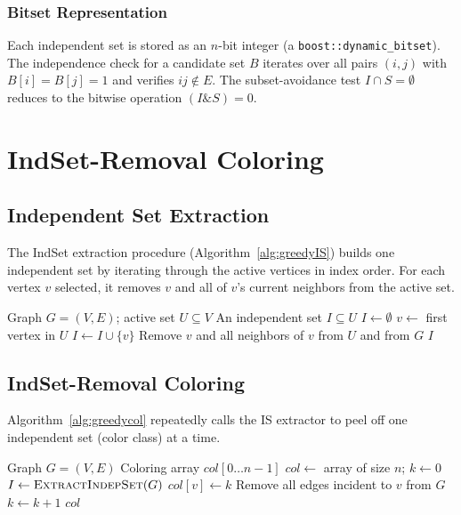 \documentclass[11pt]{article}
\begin{document}
\subsubsection*{Bitset Representation}

Each independent set is stored as an $n$-bit integer (a
\texttt{boost::dynamic\_bitset}).  The independence check for a candidate set
$B$ iterates over all pairs $(i,j)$ with $B[i]=B[j]=1$ and verifies $ij \notin
E$.  The subset-avoidance test $I \cap S = \emptyset$ reduces to the bitwise
operation $(I \mathbin{\&} S) = 0$.

\section{IndSet-Removal Coloring}\label{sec:heuristic}

\subsection{Independent Set Extraction}

The IndSet extraction procedure (Algorithm~\ref{alg:greedyIS}) builds one
independent set by iterating through the active vertices in index order.
For each vertex $v$ selected, it removes $v$ and all of $v$'s current
neighbors from the active set.

\begin{algorithm}
\caption{Independent set extraction}\label{alg:greedyIS}
\begin{algorithmic}[1]
\Require Graph $G = (V, E)$; active set $U \subseteq V$
\Ensure An independent set $I \subseteq U$
\State $I \gets \emptyset$
  \State $v \gets$ first vertex in $U$
  \State $I \gets I \cup \{v\}$
  \State Remove $v$ and all neighbors of $v$ from $U$ and from $G$
\EndWhile
\Return $I$
\end{algorithmic}
\end{algorithm}

\subsection{IndSet-Removal Coloring}

Algorithm~\ref{alg:greedycol} repeatedly calls the IS extractor to peel off
one independent set (color class) at a time.

\begin{algorithm}
\caption{IndSet-Removal Coloring}\label{alg:greedycol}
\begin{algorithmic}[1]
\Require Graph $G = (V, E)$
\Ensure Coloring array $\mathit{col}[0\ldots n-1]$
\State $\mathit{col} \gets$ array of size $n$; $k \gets 0$
  \State $I \gets \textsc{ExtractIndepSet}(G)$
    \State $\mathit{col}[v] \gets k$
    \State Remove all edges incident to $v$ from $G$
  \EndFor
  \State $k \gets k + 1$
\EndWhile
\Return $\mathit{col}$
\end{algorithmic}
\end{algorithm}
\end{document}
